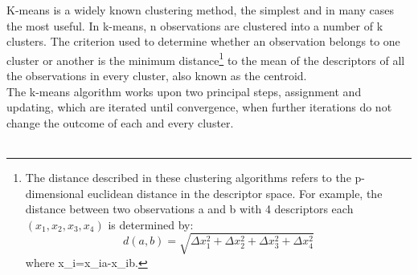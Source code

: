 K-means is a widely known clustering method, the simplest and in many cases the most useful. In k-means, n observations are clustered into a number of k clusters. The criterion used to determine whether an observation belongs to one cluster or another is the minimum distance\footnote{The distance described in these clustering algorithms refers to the p-dimensional euclidean distance in the descriptor space. For example, the distance between two observations a and b with 4 descriptors each $(x_1,x_2,x_3,x_4)$ is determined by:
\begin{equation}
    d(a,b)=\sqrt{\Delta x_1^2+\Delta x_2^2 + \Delta x_3^2 + \Delta x_4^2}
\end{equation}
where \Delta x_i=x_{ia}-x_{ib}.} to the mean of the descriptors of all the observations in every cluster, also known as the centroid.\\

The k-means algorithm works upon two principal steps, assignment and updating, which are iterated until convergence, when further iterations do not change the outcome of each and every cluster.\\\\

